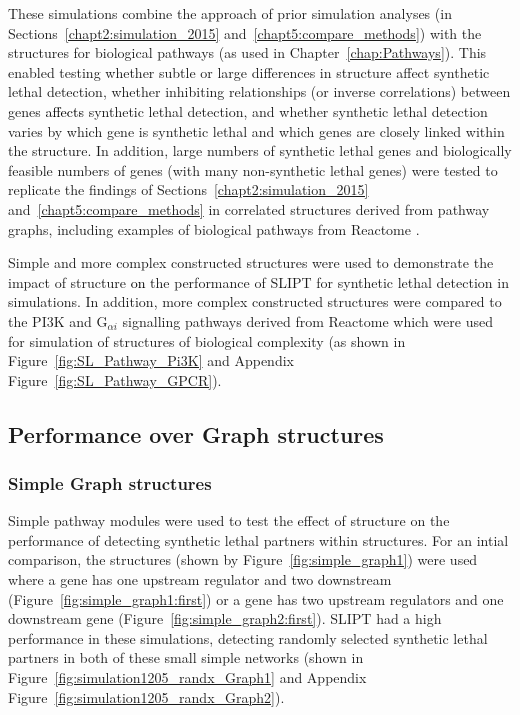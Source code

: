 These simulations combine the approach of prior simulation analyses (in Sections~\ref{chapt2:simulation_2015} and~\ref{chapt5:compare_methods}) with the  structures for biological pathways (as used in Chapter~\ref{chap:Pathways}). This enabled testing whether subtle or large differences in  structure affect \gls{synthetic lethal} detection, whether inhibiting relationships (or inverse correlations) between genes \textcolor{black}{affects} \gls{synthetic lethal} detection, and whether \gls{synthetic lethal} detection varies by which gene is \gls{synthetic lethal} and which genes are closely linked within the  structure. In addition, large numbers of \gls{synthetic lethal} genes and biologically feasible numbers of genes (with many non-synthetic lethal genes) were tested to replicate the findings of Sections~\ref{chapt2:simulation_2015} and~\ref{chapt5:compare_methods} in correlated structures derived from pathway graphs, including examples of biological pathways from Reactome \citep{Reactome}.

Simple and more complex constructed  structures were used to demonstrate the impact of  structure \textcolor{black}{on} the performance of \gls{SLIPT} for \gls{synthetic lethal} detection in simulations. In addition, more complex constructed  structures were compared to the PI3K and G$_{\alpha i}$ signalling pathways derived from Reactome which were used for simulation of  structures of biological complexity (as shown in Figure~\ref{fig:SL_Pathway_Pi3K} and Appendix Figure~\ref{fig:SL_Pathway_GPCR}).

\FloatBarrier

\subsection{Performance over Graph structures}
\label{chapt5:graphsim_performance}

\subsubsection{Simple Graph structures}
\label{chapt5:graphsim_performance_simple}

\FloatBarrier

Simple pathway modules were used to test the effect of  structure on the performance of detecting \gls{synthetic lethal} partners within  structures. For an intial comparison, the  structures (shown by Figure~\ref{fig:simple_graph1}) were used where a gene has one upstream regulator and two downstream (Figure~\ref{fig:simple_graph1:first}) or a gene has two upstream regulators and one downstream gene (Figure~\ref{fig:simple_graph2:first}). \gls{SLIPT} had a high performance in these simulations, detecting randomly selected \gls{synthetic lethal} partners in both of these small simple networks (shown in Figure~\ref{fig:simulation1205_randx_Graph1} and Appendix Figure~\ref{fig:simulation1205_randx_Graph2}). 

